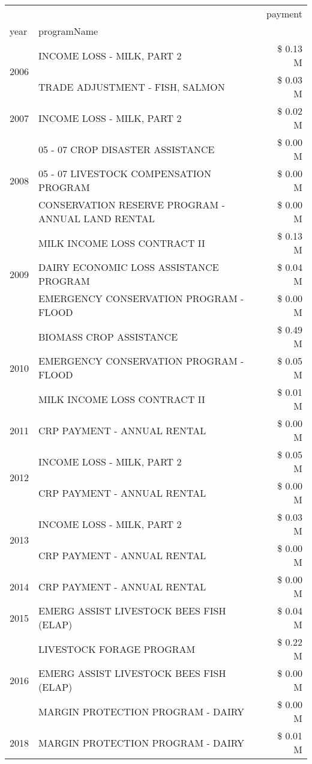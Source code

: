 \begin{tabular}{llr}
\toprule
 &  & payment \\
year & programName &  \\
\midrule
\multirow[t]{2}{*}{2006} & INCOME LOSS - MILK, PART 2 & \$ 0.13 M \\
 & TRADE ADJUSTMENT - FISH, SALMON & \$ 0.03 M \\
\cline{1-3}
2007 & INCOME LOSS - MILK, PART 2 & \$ 0.02 M \\
\cline{1-3}
\multirow[t]{3}{*}{2008} & 05 - 07 CROP DISASTER ASSISTANCE & \$ 0.00 M \\
 & 05 - 07 LIVESTOCK COMPENSATION PROGRAM & \$ 0.00 M \\
 & CONSERVATION RESERVE PROGRAM - ANNUAL LAND RENTAL & \$ 0.00 M \\
\cline{1-3}
\multirow[t]{3}{*}{2009} & MILK INCOME LOSS CONTRACT II & \$ 0.13 M \\
 & DAIRY ECONOMIC LOSS ASSISTANCE PROGRAM & \$ 0.04 M \\
 & EMERGENCY CONSERVATION PROGRAM - FLOOD & \$ 0.00 M \\
\cline{1-3}
\multirow[t]{3}{*}{2010} & BIOMASS CROP ASSISTANCE & \$ 0.49 M \\
 & EMERGENCY CONSERVATION PROGRAM - FLOOD & \$ 0.05 M \\
 & MILK INCOME LOSS CONTRACT II & \$ 0.01 M \\
\cline{1-3}
2011 & CRP PAYMENT - ANNUAL RENTAL & \$ 0.00 M \\
\cline{1-3}
\multirow[t]{2}{*}{2012} & INCOME LOSS - MILK, PART 2 & \$ 0.05 M \\
 & CRP PAYMENT - ANNUAL RENTAL & \$ 0.00 M \\
\cline{1-3}
\multirow[t]{2}{*}{2013} & INCOME LOSS - MILK, PART 2 & \$ 0.03 M \\
 & CRP PAYMENT - ANNUAL RENTAL & \$ 0.00 M \\
\cline{1-3}
2014 & CRP PAYMENT - ANNUAL RENTAL & \$ 0.00 M \\
\cline{1-3}
2015 & EMERG ASSIST LIVESTOCK BEES FISH (ELAP) & \$ 0.04 M \\
\cline{1-3}
\multirow[t]{3}{*}{2016} & LIVESTOCK FORAGE PROGRAM & \$ 0.22 M \\
 & EMERG ASSIST LIVESTOCK BEES FISH (ELAP) & \$ 0.00 M \\
 & MARGIN PROTECTION PROGRAM - DAIRY & \$ 0.00 M \\
\cline{1-3}
\multirow[t]{3}{*}{2018} & MARGIN PROTECTION PROGRAM - DAIRY & \$ 0.01 M \\

\end{tabular}
